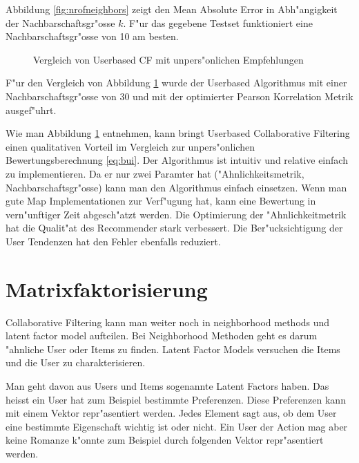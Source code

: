 \documentclass[a4paper, 12pt]{article}
\begin{document}
Abbildung \ref{fig:nrofneighbors} zeigt den Mean Absolute Error in Abh"angigkeit der Nachbarschaftsgr"osse $k$. F"ur das gegebene Testset funktioniert eine Nachbarschaftsgr"osse von 10 am besten.

\begin{figure}
  \centering
{}
\label{fig:uuvsbui}
\caption{Vergleich von Userbased CF mit unpers"onlichen Empfehlungen}
\end{figure}

F"ur den Vergleich von Abbildung \ref{fig:uuvsbui} wurde der Userbased Algorithmus mit einer Nachbarschaftsgr"osse von 30 und mit der optimierter Pearson Korrelation Metrik ausgef"uhrt. 

Wie man Abbildung \ref{fig:uuvsbui} entnehmen, kann bringt Userbased Collaborative Filtering einen qualitativen Vorteil im Vergleich zur unpers"onlichen Bewertungsberechnung \ref{eq:bui}. Der Algorithmus ist intuitiv und relative einfach zu implementieren. Da er nur zwei Paramter hat ("Ahnlichkeitsmetrik, Nachbarschaftsgr"osse) kann man den Algorithmus einfach einsetzen. Wenn man gute Map Implementationen zur Verf"ugung hat, kann eine Bewertung in vern"unftiger Zeit abgesch"atzt werden.
Die Optimierung der "Ahnlichkeitmetrik hat die Qualit"at des Recommender stark verbessert. Die Ber"ucksichtigung der User Tendenzen hat den Fehler ebenfalls reduziert.

\section{Matrixfaktorisierung}
\label{sec:matrixfactorization}

Collaborative Filtering kann man weiter noch in neighborhood methods und latent factor model aufteilen. Bei Neighborhood Methoden geht es darum "ahnliche User oder Items zu finden. Latent Factor Models versuchen die Items und die User zu charakterisieren. 

Man geht davon aus Users und Items sogenannte Latent Factors haben. Das heisst ein User hat zum Beispiel bestimmte Preferenzen. Diese Preferenzen kann mit einem Vektor repr"asentiert werden. Jedes Element sagt aus, ob dem User eine bestimmte Eigenschaft wichtig ist oder nicht. Ein User der Action mag aber keine Romanze k"onnte zum Beispiel durch folgenden Vektor repr"asentiert werden.
\end{document}
